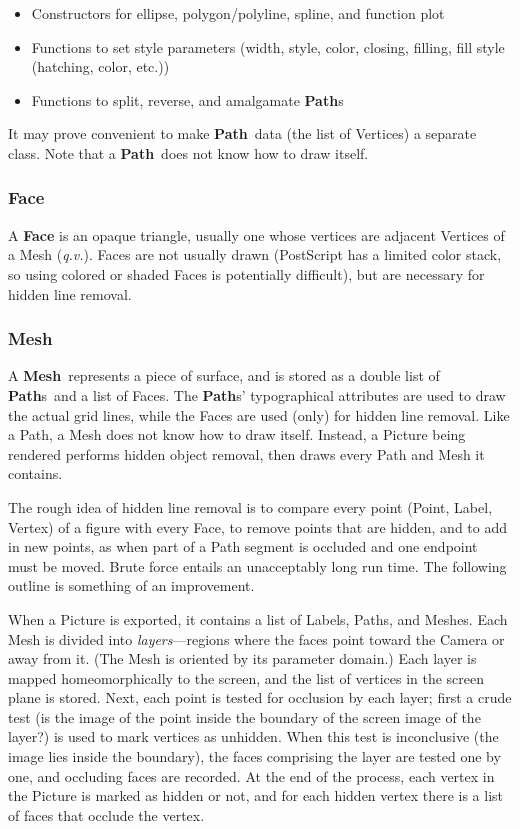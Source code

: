 \documentclass[12pt]{article}
\newcommand{\Class}[1]{\textbf{#1}}
\newcommand{\Mesh}{\Class{Mesh}}
\newcommand{\Path}{\Class{Path}}
\newcommand{\Paths}{\Class{Path}s}
\newcommand{\bi}{\begin{itemize}}
\newcommand{\ei}{\end{itemize}}
\begin{document}
\bi
  \item Constructors for ellipse, polygon/polyline, spline, and
    function plot

  \item Functions to set style parameters (width, style, color,
  closing, filling, fill style (hatching, color, etc.))

  \item Functions to split, reverse, and amalgamate \Paths
    
\ei

It may prove convenient to make \Path\ data (the list of Vertices) a
separate class. Note that a \Path\ does not know how to draw itself.

\subsubsection*{Face}

A \Class{Face} is an opaque triangle, usually one whose vertices are
adjacent Vertices of a Mesh (\emph{q.v.}). Faces are not usually drawn
(PostScript has a limited color stack, so using colored or shaded
Faces is potentially difficult), but are necessary for hidden line
removal. 

\subsubsection*{Mesh}

A \Mesh\ represents a piece of surface, and is stored as a double list
of \Paths~and a list of Faces. The \Paths' typographical attributes
are used to draw the actual grid lines, while the Faces are used
(only) for hidden line removal. Like a Path, a Mesh does not know how
to draw itself. Instead, a Picture being rendered performs hidden
object removal, then draws every Path and Mesh it contains.

The rough idea of hidden line removal is to compare every point
(Point, Label, Vertex) of a figure with every Face, to remove points
that are hidden, and to add in new points, as when part of a Path
segment is occluded and one endpoint must be moved. Brute force
entails an unacceptably long run time. The following outline is
something of an improvement.

When a Picture is exported, it contains a list of Labels, Paths, and
Meshes. Each Mesh is divided into \emph{layers}---regions where the
faces point toward the Camera or away from it. (The Mesh is oriented
by its parameter domain.) Each layer is mapped homeomorphically to the
screen, and the list of vertices in the screen plane is stored. Next,
each point is tested for occlusion by each layer; first a crude test
(is the image of the point inside the boundary of the screen image of
the layer?) is used to mark vertices as unhidden. When this test is
inconclusive (the image lies inside the boundary), the faces
comprising the layer are tested one by one, and occluding faces are
recorded. At the end of the process, each vertex in the Picture is
marked as hidden or not, and for each hidden vertex there is a list of
faces that occlude the vertex.
\end{document}
